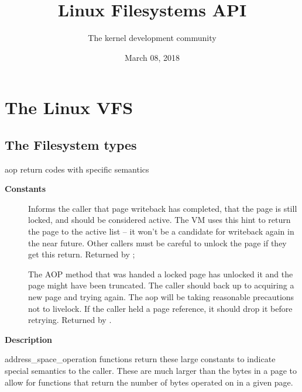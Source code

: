 \documentclass[a4paper,8pt,english]{sphinxmanual}
\title{Linux Filesystems API}
\date{March 08, 2018}
\author{The kernel development community}
\begin{document}
\maketitle
\tableofcontents
{}\label{filesystems/index::doc}



\chapter{The Linux VFS}
\label{filesystems/index:the-linux-vfs}\label{filesystems/index:linux-filesystems-api}

\section{The Filesystem types}
\label{filesystems/index:the-filesystem-types}

\begin{fulllineitems}
\label{filesystems/index:c.positive_aop_returns}
aop return codes with specific semantics

\end{fulllineitems}


\textbf{Constants}
\begin{description}
\item[{}] \leavevmode
Informs the caller that page writeback has
completed, that the page is still locked, and
should be considered active.  The VM uses this hint
to return the page to the active list -- it won't
be a candidate for writeback again in the near
future.  Other callers must be careful to unlock
the page if they get this return.  Returned by
;

\item[{}] \leavevmode
The AOP method that was handed a locked page has
unlocked it and the page might have been truncated.
The caller should back up to acquiring a new page and
trying again.  The aop will be taking reasonable
precautions not to livelock.  If the caller held a page
reference, it should drop it before retrying.  Returned
by .

\end{description}

\textbf{Description}

address\_space\_operation functions return these large constants to indicate
special semantics to the caller.  These are much larger than the bytes in a
page to allow for functions that return the number of bytes operated on in a
given page.
\end{document}
